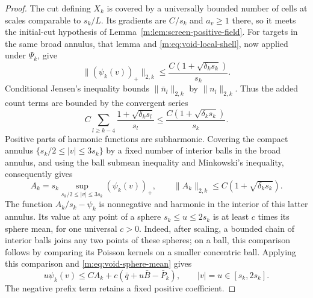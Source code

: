 \begin{proof}
The cut defining $X_k$ is covered by a universally bounded number of
cells at scales comparable to $s_k/L$.  Its gradients are $C/s_k$ and
$a_v\ge1$ there, so it meets the initial-cut hypothesis of
Lemma~\ref{m:lem:screen-positive-field}.  For targets in the same broad
annulus, that lemma and \eqref{m:eq:void-local-shell}, now applied under
$\Psi_k$, give
\[
 \|(\psi_k(v))_+\|_{2,k}
 \le \frac{C(1+\sqrt{\delta_k s_k})}{s_k}.
\]
Conditional Jensen's inequality bounds $\|\bar n_l\|_{2,k}$ by
$\|n_l\|_{2,k}$.  Thus the added count terms are bounded by the convergent series
\[
 C\sum_{l\ge k-4}\frac{1+\sqrt{\delta_k s_l}}{s_l}
 \le \frac{C(1+\sqrt{\delta_k s_k})}{s_k}.
\]
Positive parts of harmonic functions are subharmonic.  Covering the
compact annulus $\{s_k/2\le|v|\le3s_k\}$ by a fixed number of interior
balls in the broad annulus, and using the ball submean inequality and
Minkowski's inequality, consequently gives
\begin{equation}\label{m:eq:void-positive-supremum}
 A_k=s_k\sup_{s_k/2\le|v|\le3s_k}(\psi_k(v))_+,
 \qquad \|A_k\|_{2,k}\le C(1+\sqrt{\delta_k s_k}).
\end{equation}
The function $A_k/s_k-\psi_k$ is nonnegative and harmonic in the interior
of this latter annulus.  Its value at any point of a sphere
$s_k\le u\le2s_k$ is at least $c$ times its sphere mean, for one universal
$c>0$.  Indeed, after scaling, a bounded chain of interior balls joins
any two points of these spheres; on a ball, this comparison follows by
comparing its Poisson kernels on a smaller concentric ball.  Applying
this comparison and \eqref{m:eq:void-sphere-mean} gives
\begin{equation}\label{m:eq:void-harnack}
 u\psi_k(v)\le C A_k+c(\bar q+u\bar B-\bar P_k),
 \qquad |v|=u\in[s_k,2s_k].
\end{equation}
The negative prefix term retains a fixed positive coefficient.


\end{proof}
